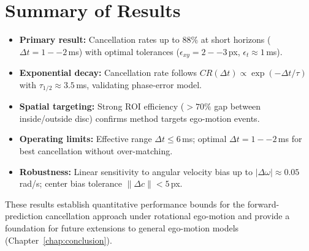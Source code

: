 \section{Summary of Results}

\begin{itemize}
\item \textbf{Primary result:} Cancellation rates up to 88\% at short horizons ($\Delta t=1--2$\,ms) with optimal tolerances ($\epsilon_{xy}=2--3$\,px, $\epsilon_t \approx 1$\,ms).
\item \textbf{Exponential decay:} Cancellation rate follows $CR(\Delta t) \propto \exp(-\Delta t / \tau)$ with $\tau_{1/2} \approx 3.5$\,ms, validating phase-error model.
\item \textbf{Spatial targeting:} Strong ROI efficiency ($> 70\%$ gap between inside/outside disc) confirms method targets ego-motion events.
\item \textbf{Operating limits:} Effective range $\Delta t \leq 6$\,ms; optimal $\Delta t = 1--2$\,ms for best cancellation without over-matching.
\item \textbf{Robustness:} Linear sensitivity to angular velocity bias up to $|\Delta\omega| \approx 0.05$\,rad/s; center bias tolerance $\|\Delta c\| < 5$\,px.
\end{itemize}

These results establish quantitative performance bounds for the forward-prediction cancellation approach under rotational ego-motion and provide a foundation for future extensions to general ego-motion models (Chapter~\ref{chap:conclusion}).
